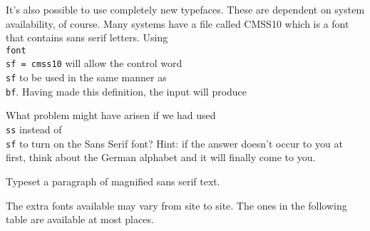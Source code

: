 \bigskip 
 
It's also possible to use completely new typefaces.  These 
are dependent on system availability, of course.  Many systems 
have a file called CMSS10 which is a font that contains sans 
serif letters.  Using {\tt \\font\\sf = cmss10} will allow the 
control word {\tt\\sf} to be used in the same manner as {\tt\\bf}. 
Having made this definition, the input 
will produce 
 
\exercise What problem might have arisen if we had used {\tt \\ss} 
instead of {\tt \\sf} to turn on the Sans Serif font? Hint: if 
the answer doesn't occur to you at first, think about the German 
alphabet and it will finally come to you. 
 
\exercise Typeset a paragraph of magnified sans serif text. 
 
The extra fonts available may vary from site to site.  The ones 
in the following table are available at most places. 
 
